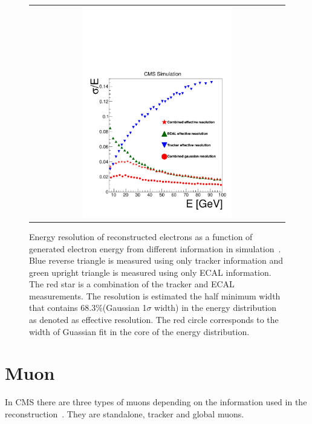 \begin{figure}[htp] 
\centering 
\begin{tabular}{c} 
\includegraphics[width=0.6\textwidth]{figures/effRMSfinal-3.pdf} 
\end{tabular} 
\caption{Energy resolution of reconstructed electrons as a function 
of generated electron energy from different information 
in simulation~\cite{PAS-HIG-13-002}. 
Blue reverse triangle is measured using only tracker information 
and green upright triangle is measured using only ECAL information. 
The red star is a combination of the tracker and ECAL measurements. 
The resolution is estimated the half minimum width that
contains 68.3\%(Gaussian 1$\sigma$ width) in the energy distribution
as denoted as effective resolution. The red circle corresponds to the 
width of Guassian fit in the core of the energy distribution.
}
\label{fig:ElectronEnergyResMC} 
\end{figure} 

\section{ Muon }
\label{sec:muon_reco}

In CMS there are three types of muons depending on the information used in the 
reconstruction~\cite{cmstdr1}. They are standalone, tracker and global muons.   

